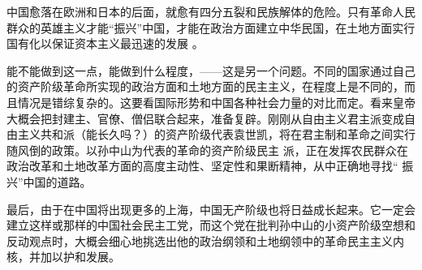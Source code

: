 \documentclass{article}
\begin{document}
中国愈落在欧洲和日本的后面，就愈有四分五裂和民族解体的危险。只有革命人民群众的英雄主义才能“振兴”中国，才能在政治方面建立中华民国，在土地方面实行国有化以保证资本主义最迅速的发展
。 

能不能做到这一点，能做到什么程度，——这是另一个问题。不同的国家通过自己的资产阶级革命所实现的政治方面和土地方面的民主主义，在程度上是不同的，而且情况是错综复杂的。这要看国际形势和中国各种社会力量的对比而定。看来皇帝大概会把封建主、官僚、僧侣联合起来，准备复辟。刚刚从自由主义君主派变成自由主义共和派（能长久吗？）的资产阶级代表袁世凯，将在君主制和革命之间实行随风倒的政策。以孙中山为代表的革命的资产阶级民主
\newpage
派，正在发挥农民群众在政治改革和土地改革方面的高度主动性、坚定性和果断精神，从中正确地寻找“
振兴”中国的道路。 

最后，由于在中国将出现更多的上海，中国无产阶级也将日益成长起来。它一定会建立这样或那样的中国社会民主工党，而这个党在批判孙中山的小资产阶级空想和反动观点时，大概会细心地挑选出他的政治纲领和土地纲领中的革命民主主义内核，并加以护和发展。
\end{document}
